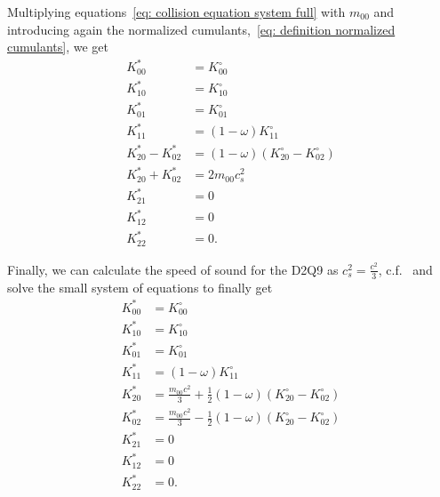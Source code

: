 Multiplying equations~\eqref{eq: collision equation system full} with $m_{00}$ and introducing again the normalized cumulants,~\eqref{eq: definition normalized cumulants}, we get
\begin{equation}
  \label{eq: final collision all relaxations}
  \begin{aligned}
    K_{00}^{*} & = K_{00}^{\circ}\\
    K_{10}^{*} & = K_{10}^{\circ}\\
    K_{01}^{*} & = K_{01}^{\circ}\\
    K_{11}^{*} & = (1-\omega)K_{11}^{\circ}\\
    K_{20}^{*} - K_{02}^{*} & = (1-\omega) (K_{20}^{\circ}- K_{02}^{\circ}) \\
    K_{20}^{*} + K_{02}^{*} & = 2 m_{00} c_s^2 \\
    K_{21}^{*} & = 0 \\
    K_{12}^{*} & = 0 \\
    K_{22}^{*} & = 0.
  \end{aligned}
\end{equation}

Finally, we can calculate the speed of sound for the D2Q9 as $c_s^2=\frac{c^2}{3}$, c.f.~\cite[page 175]{wolf2000lattice} and solve the small system of equations to finally get
\begin{equation}
  \label{eq: final collision one relaxation}
  \begin{aligned}
    K_{00}^{*} & = K_{00}^{\circ}\\
    K_{10}^{*} & = K_{10}^{\circ}\\
    K_{01}^{*} & = K_{01}^{\circ}\\
    K_{11}^{*} & = (1-\omega)K_{11}^{\circ}\\
    K_{20}^{*} & = \frac{m_{00}c^2}{3} + \frac{1}{2}(1-\omega) (K_{20}^{\circ}- K_{02}^{\circ}) \\
    K_{02}^{*} & = \frac{m_{00}c^2}{3} - \frac{1}{2}(1-\omega) (K_{20}^{\circ}- K_{02}^{\circ}) \\
    K_{21}^{*} & = 0 \\
    K_{12}^{*} & = 0 \\
    K_{22}^{*} & = 0.
  \end{aligned}
\end{equation}
